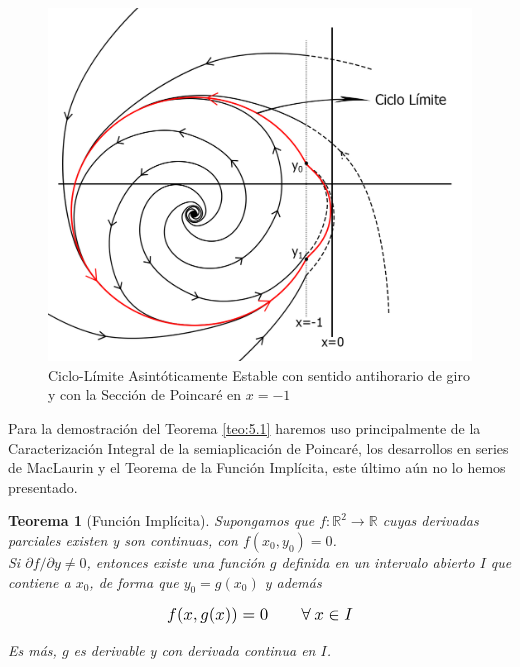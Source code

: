 \documentclass[12pt,a4paper]{report} %
\newtheorem{theorem}{Teorema}[chapter]
\begin{document}
	\newpage
	
	\begin{figure}[h]
		\centering
		\includegraphics[width=1\textwidth]{ciclolimite3.jpg}
		\caption{Ciclo-Límite Asintóticamente Estable con sentido antihorario de giro y con la Sección de Poincaré en $x=-1$}
		\label{fig:ciclolimite3}
	\end{figure}\smallskip
	
	\newpage
	
	Para la demostración del Teorema \ref{teo:5.1} haremos uso principalmente de la Caracterización Integral de la semiaplicación de Poincaré, los desarrollos en series de MacLaurin y el Teorema de la Función Implícita, este último aún no lo hemos presentado.
	
	\begin{theorem}[Función Implícita]
		\label{teo.fi}
		Supongamos que $f:\mathbb{R}^2 \longrightarrow\mathbb{R}$ cuyas derivadas parciales existen y son continuas, con $f(x_0,y_0)=0$.\\[0.2cm]
		Si $\partial f / \partial y\neq0$, entonces existe una función $g$ definida en un intervalo abierto $I$ que contiene a $x_0$, de forma que $y_0=g(x_0)$ y además
		
		\begin{equation*}
			\scalebox{1.2}{$\displaystyle
			f(x,g(x))=0 \qquad \forall \: x\in I
			$}
		\end{equation*}\smallskip
		
		\noindent Es más, $g$ es derivable y con derivada continua en $I$.
		
	\end{theorem}
	
\end{document}
